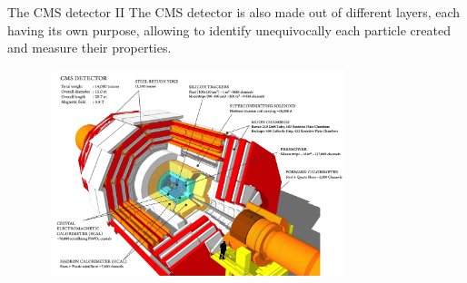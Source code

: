 \documentclass[8pt]{beamer}
\begin{document}
\begin{frame}{The CMS detector II}
\justifying
The CMS detector is also \alert{made out of different layers}, each having its own purpose, allowing to identify unequivocally each particle created and measure their properties. \vfill

\begin{figure}[htbp]
\begin{center}
\includegraphics[width=9cm, height=6cm]{figs/CMS.png}
\end{center}
\end{figure} \vfill
\end{frame}
\end{document}
